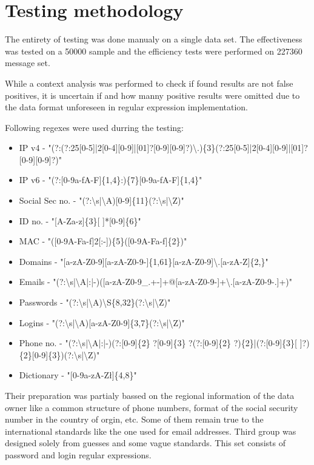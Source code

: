\documentclass[a4paper,twoside,12pt]{book}
\begin{document}
\section{Testing methodology}

The entirety of testing was done manualy on a single data set. The effectiveness was tested on a 50000 sample and
the efficiency tests were performed on 227360 message set.

While a context analysis was performed to check if found results are not false positives, it is uncertain if and how manny
positive results were omitted due to the data format unforeseen in regular expression implementation. 

Following regexes were used durring the testing: 

\begin{itemize}
   \item IP v4 - "(?:(?:25[0-5]|2[0-4][0-9]|[01]?[0-9][0-9]?)\textbackslash .)\{3\}(?:25[0-5]|2[0-4][0-9]|[01]?[0-9][0-9]?)"
   \item IP v6 - "(?:[0-9a-fA-F]\{1,4\}:)\{7\}[0-9a-fA-F]\{1,4\}"
   \item Social Sec no. - "(?:\textbackslash s|\textbackslash A)[0-9]\{11\}(?:\textbackslash s|\textbackslash Z)"
   \item ID no. - "[A-Za-z]\{3\}[ ]*[0-9]\{6\}"
   \item MAC - "([0-9A-Fa-f]{2}[:-])\{5\}([0-9A-Fa-f]\{2\})"
   \item Domains - "[a-zA-Z0-9][a-zA-Z0-9-]\{1,61\}[a-zA-Z0-9]\textbackslash .[a-zA-Z]\{2,\}"
   \item Emails - "(?:\textbackslash s|\textbackslash A|:|-)([a-zA-Z0-9\_.+-]+@[a-zA-Z0-9-]+\textbackslash .[a-zA-Z0-9-.]+)"
   \item Passwords - "(?:\textbackslash s|\textbackslash A)\textbackslash S\{8,32\}(?:\textbackslash s|\textbackslash Z)"
   \item Logins - "(?:\textbackslash s|\textbackslash A)[a-zA-Z0-9]\{3,7\}(?:\textbackslash s|\textbackslash Z)"
   \item Phone no. - "(?:\textbackslash s|\textbackslash A|:|-)(?:[0-9]\{2\} ?[0-9]\{3\} ?(?:[0-9]\{2\} ?)\{2\}|(?:[0-9]\{3\}[ ]?)\{2\}[0-9]\{3\})(?:\textbackslash s|\textbackslash Z)"
   \item Dictionary - "[0-9a-zA-Zł]\{4,8\}"
\end{itemize}

Their preparation was partialy bassed on the regional information of the data owner like a common structure of phone numbers, format of the social security number in the
country of orgin, etc. Some of them remain true to the international standards like the one used for email addresses. Third group was designed solely from guesses and
some vague standards. This set consists of password and login regular expressions.
\end{document}
